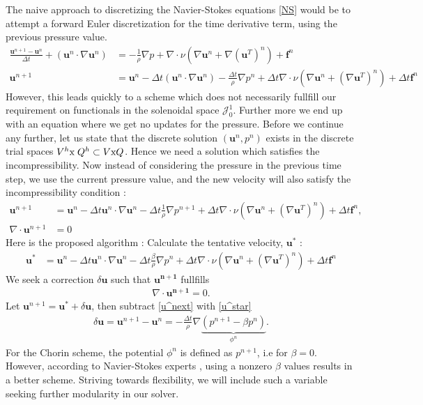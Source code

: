 \documentclass[11pt]{article}
\begin{document}
{The naive approach to discretizing the Navier-Stokes equations \eqref{NS} would be to 
attempt a forward Euler discretization for the time derivative term, using the previous 
pressure value. 
\begin{align*}
\frac{\mathbf{u}^{n+1} - \mathbf{u}^n}{\Delta t} + (\mathbf{u}^n \cdot \nabla \mathbf{u}^n) &=
-\frac{1}{\rho} \nabla p + \nabla \cdot \nu(\nabla\mathbf{u}^n + \nabla (\mathbf{u}^T)^{n}) 
+ \mathbf{f}^n \\
\mathbf{u}^{n+1} &= \mathbf{u}^n - \Delta t(\mathbf{u}^n \cdot \nabla \mathbf{u}^n) 
-\frac{\Delta t}{\rho} \nabla p^n + \Delta t\nabla \cdot \nu(\nabla\mathbf{u}^n + 
(\nabla \mathbf{u}^T)^{n}) + \Delta t\mathbf{f}^n
\end{align*}
However, this leads quickly to a scheme which does not necessarily fullfill 
our requirement on functionals in the solenoidal space $\mathcal{J}_0^1$. Further more
we end up with an equation where we get no updates for the pressure. Before we 
continue any further, let us state that the discrete solution $(\mathbf{u}^n,p^n)$ exists
in the discrete trial spaces $V^h\text{x} \hspace{1mm}Q^h \subset V\text{x}Q$. 
Hence we need a solution which satisfies the incompressibility. Now instead of considering
the pressure in the previous time step, we use the current pressure value, and the new
velocity will also satisfy the incompressibility condition : 
\begin{align}
\label{u^next}
\mathbf{u}^{n+1} &= \mathbf{u}^n - \Delta t \mathbf{u}^n\cdot\nabla \mathbf{u}^n - 
\Delta t\frac{1}{\rho} \nabla p^{n+1} + \Delta t\nabla \cdot \nu(\nabla\mathbf{u}^n + 
(\nabla\mathbf{u}^T)^{n}) + \Delta t\mathbf{f}^n, \\
\label{u^next_continuity}
\nabla \cdot \mathbf{u}^{n+1} &= 0
\end{align}
Here is the proposed algorithm : Calculate the tentative velocity, $\mathbf{u}^*$ :
\begin{align}
\label{u^star}
\mathbf{u}^* &= \mathbf{u}^n - \Delta t \mathbf{u}^n\cdot\nabla \mathbf{u}^n - 
\Delta t\frac{\beta}{\rho} \nabla p^n + \Delta t\nabla \cdot \nu(\nabla\mathbf{u}^n + 
(\nabla\mathbf{u}^T)^{n}) + \Delta t\mathbf{f}^n
\end{align}
We seek a correction $\delta \mathbf{u}$ such that $\mathbf{u^{n+1}}$ fullfills 
\begin{align}
\label{discrete_divergence}
\nabla \cdot \mathbf{u^{n+1}} = 0.
\end{align}
Let $\mathbf{u}^{n+1} = \mathbf{u}^* + \delta \mathbf{u}$, then subtract \eqref{u^next} 
with \eqref{u^star}
\begin{align}
\label{correction}
\delta \mathbf{u} = \mathbf{u}^{n+1} - \mathbf{u}^n = 
- \frac{\Delta t}{\rho}\nabla\underbrace{(p^{n+1} - \beta p^n)}_{\phi^n}.
\end{align}
For the Chorin scheme, the potential $\phi^n$ is defined as $p^{n+1}$, i.e for $\beta = 0$.
However, according to Navier-Stokes experts \cite{10}, using a nonzero $\beta$ 
values results in a better scheme. Striving towards flexibility, we will include such a variable 
seeking further modularity in our solver.

}
\end{document}
